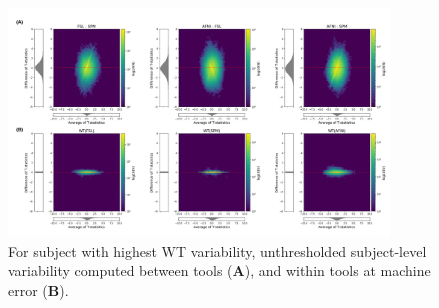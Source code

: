 \documentclass[11pt,onecolumn]{article}
\begin{document}
\begin{figure}[ht]
  \centering
  \includegraphics[width=0.9\textwidth]{figures/plots/Bland-Altman/with-masking/unthresh-sbj04.png}
  \caption{For subject with highest WT variability,
    unthresholded subject-level variability computed between tools (\textbf{A}), and within tools at machine error (\textbf{B}).}
  \label{fig:unthresh-maps-sbj}
\end{figure}

\end{document}
